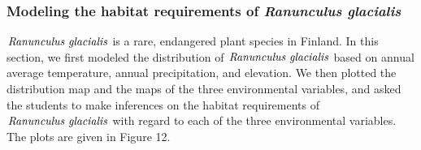 \documentclass{article}
\begin{document}
\subsubsection*{Modeling the habitat requirements of \emph{Ranunculus glacialis}}
$\emph{Ranunculus glacialis}$ is a rare, endangered plant species in Finland. In this section, we first modeled the distribution of $\emph{Ranunculus glacialis}$ based on annual average temperature, annual precipitation, and elevation. We then plotted the distribution map and the maps of the three environmental variables, and asked the students to make inferences on the habitat requirements of $\emph{Ranunculus glacialis}$ with regard to each of the three environmental variables. The plots are given in Figure 12.
\newpage
\begin{figure}[h]
	\vspace*{-3mm}
	\centering
	\vspace*{-10mm}
\end{figure}
\end{document}
